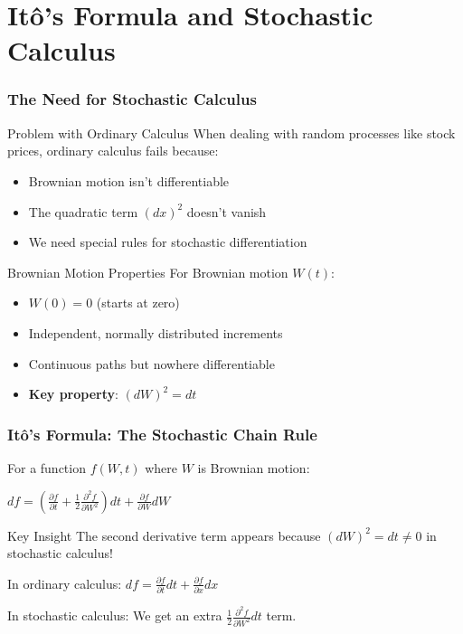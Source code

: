 \documentclass{beamer}
\begin{document}
\section{Itô's Formula and Stochastic Calculus}

\begin{frame}
\frametitle{The Need for Stochastic Calculus}
\begin{block}{Problem with Ordinary Calculus}
When dealing with random processes like stock prices, ordinary calculus fails because:
\begin{itemize}
\item Brownian motion isn't differentiable
\item The quadratic term $(dx)^2$ doesn't vanish
\item We need special rules for stochastic differentiation
\end{itemize}
\end{block}

\begin{block}{Brownian Motion Properties}
For Brownian motion $W(t)$:
\begin{itemize}
\item $W(0) = 0$ (starts at zero)
\item Independent, normally distributed increments
\item Continuous paths but nowhere differentiable
\item \textbf{Key property}: $(dW)^2 = dt$
\end{itemize}
\end{block}
\end{frame}

\begin{frame}
\frametitle{Itô's Formula: The Stochastic Chain Rule}
For a function $f(W,t)$ where $W$ is Brownian motion:

$df = \left(\frac{\partial f}{\partial t} + \frac{1}{2} \frac{\partial^2 f}{\partial W^2}\right) dt + \frac{\partial f}{\partial W} dW$

\begin{block}{Key Insight}
The second derivative term appears because $(dW)^2 = dt \neq 0$ in stochastic calculus!
\end{block}

In ordinary calculus: $df = \frac{\partial f}{\partial t}dt + \frac{\partial f}{\partial x}dx$

In stochastic calculus: We get an extra $\frac{1}{2}\frac{\partial^2 f}{\partial W^2}dt$ term.
\end{frame}
\end{document}
